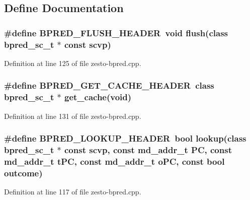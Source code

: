 \subsection{Define Documentation}
\subsubsection[{BPRED\_\-FLUSH\_\-HEADER}]{\setlength{\rightskip}{0pt plus 5cm}\#define BPRED\_\-FLUSH\_\-HEADER~void flush(class {\bf bpred\_\-sc\_\-t} $\ast$ const scvp)}\label{zesto-bpred_8cpp_bbc03e5c9eb223933b80424299dc9ea8}




Definition at line 125 of file zesto-bpred.cpp.
\subsubsection[{BPRED\_\-GET\_\-CACHE\_\-HEADER}]{\setlength{\rightskip}{0pt plus 5cm}\#define BPRED\_\-GET\_\-CACHE\_\-HEADER~class {\bf bpred\_\-sc\_\-t} $\ast$ get\_\-cache(void)}\label{zesto-bpred_8cpp_a2365c8e0aefac32cc181c010fd18a18}




Definition at line 131 of file zesto-bpred.cpp.
\subsubsection[{BPRED\_\-LOOKUP\_\-HEADER}]{\setlength{\rightskip}{0pt plus 5cm}\#define BPRED\_\-LOOKUP\_\-HEADER~bool lookup(class {\bf bpred\_\-sc\_\-t} $\ast$ const scvp, const {\bf md\_\-addr\_\-t} PC, const {\bf md\_\-addr\_\-t} tPC, const {\bf md\_\-addr\_\-t} oPC, const bool outcome)}\label{zesto-bpred_8cpp_5a057e0140a49b6bafc0345a61088940}




Definition at line 117 of file zesto-bpred.cpp.
